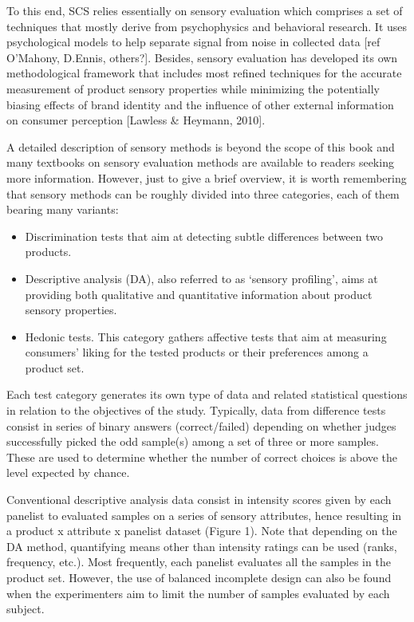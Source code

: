 \documentclass[
]{book}
\providecommand{\tightlist}{%
  \setlength{\itemsep}{0pt}\setlength{\parskip}{0pt}}
\begin{document}
To this end, SCS relies essentially on sensory evaluation which comprises a set of techniques that mostly derive from psychophysics and behavioral research. It uses psychological models to help separate signal from noise in collected data {[}ref O'Mahony, D.Ennis, others?{]}. Besides, sensory evaluation has developed its own methodological framework that includes most refined techniques for the accurate measurement of product sensory properties while minimizing the potentially biasing effects of brand identity and the influence of other external information on consumer perception {[}Lawless \& Heymann, 2010{]}.

A detailed description of sensory methods is beyond the scope of this book and many textbooks on sensory evaluation methods are available to readers seeking more information. However, just to give a brief overview, it is worth remembering that sensory methods can be roughly divided into three categories, each of them bearing many variants:

\begin{itemize}
\tightlist
\item
  Discrimination tests that aim at detecting subtle differences between two products.
\item
  Descriptive analysis (DA), also referred to as `sensory profiling', aims at providing both qualitative and quantitative information about product sensory properties.
\item
  Hedonic tests. This category gathers affective tests that aim at measuring consumers' liking for the tested products or their preferences among a product set.
\end{itemize}

Each test category generates its own type of data and related statistical questions in relation to the objectives of the study. Typically, data from difference tests consist in series of binary answers (correct/failed) depending on whether judges successfully picked the odd sample(s) among a set of three or more samples. These are used to determine whether the number of correct choices is above the level expected by chance.

Conventional descriptive analysis data consist in intensity scores given by each panelist to evaluated samples on a series of sensory attributes, hence resulting in a product x attribute x panelist dataset (Figure 1). Note that depending on the DA method, quantifying means other than intensity ratings can be used (ranks, frequency, etc.). Most frequently, each panelist evaluates all the samples in the product set. However, the use of balanced incomplete design can also be found when the experimenters aim to limit the number of samples evaluated by each subject.
\end{document}
